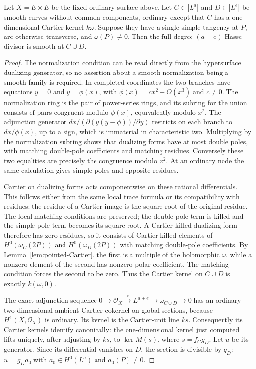 \begin{lemma}
\label{lem:mixed-tacnode-Hasse}
Let $X=E\times E$ be the fixed ordinary surface above.
Let $C\in|L^a|$ and $D\in|L^e|$ be smooth curves without common
components, ordinary except that $C$ has a one-dimensional
Cartier kernel $k\omega$. Suppose they have a single simple
tangency at $P$, are otherwise transverse, and $\omega(P)\ne0$.
Then the full degree-$(a+e)$ Hasse divisor is smooth at $C\cup D$.
\end{lemma}

\begin{proof}
The normalization condition can be read directly from the
hypersurface dualizing generator, so no assertion about a smooth
normalization being a smooth family is required. In completed
coordinates the two branches have equations $y=0$ and
$y=\phi(x)$, with $\phi(x)=c x^2+O(x^3)$ and $c\ne0$.
The normalization ring is the pair of power-series rings, and
its subring for the union consists of pairs congruent modulo
$\phi(x)$, equivalently modulo $x^2$.
The adjunction generator $dx/(\partial(y(y-\phi))/\partial y)$
restricts on each branch to $dx/\phi(x)$, up to a sign, which
is immaterial in characteristic two. Multiplying by the
normalization subring shows that dualizing forms have at most
double poles, with matching double-pole coefficients and
matching residues. Conversely these two equalities are precisely
the congruence modulo $x^2$. At an ordinary node the same
calculation gives simple poles and opposite residues.

Cartier on dualizing forms acts componentwise on these rational
differentials. This follows either from the same local trace
formula or its compatibility with residues: the residue of a
Cartier image is the square root of the original residue.
The local matching conditions are preserved; the double-pole
term is killed and the simple-pole term becomes its square root.
A Cartier-killed dualizing form therefore has zero residues,
so it consists of Cartier-killed elements of
$H^0(\omega_C(2P))$ and $H^0(\omega_D(2P))$ with matching
double-pole coefficients. By
Lemma~\ref{lem:pointed-Cartier}, the first is a multiple
of the holomorphic $\omega$, while a nonzero element of the
second has nonzero polar coefficient. The matching condition
forces the second to be zero. Thus the Cartier kernel on
$C\cup D$ is exactly $k(\omega,0)$.

The exact adjunction sequence
$0\to\mathcal O_X\xrightarrow{s}L^{a+e}\to\omega_{C\cup D}\to0$
has an ordinary two-dimensional ambient Cartier cokernel on
global sections, because $H^1(X,\mathcal O_X)$ is ordinary.
Its kernel is the Cartier-unit line $ks$. Consequently its
Cartier kernels identify canonically: the one-dimensional
kernel just computed lifts uniquely, after adjusting by $ks$,
to
$\ker M(s)$, where $s=f_Cg_D$. Let $u$ be its generator.
Since its differential vanishes on $D$, the section is divisible
by $g_D$: $u=g_Da_0$ with $a_0\in H^0(L^a)$ and $a_0(P)\ne0$.


\end{proof}
